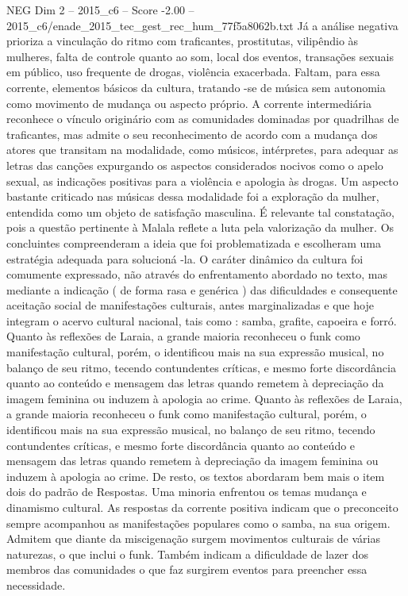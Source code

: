 \begin{textsample}{NEG Dim 2 – 2015\_c6 – Score -2.00 – 2015\_c6/enade\_2015\_tec\_gest\_rec\_hum\_77f5a8062b.txt}
Já a análise negativa prioriza a vinculação do ritmo com traficantes, prostitutas, vilipêndio às mulheres, falta de controle quanto ao som, local dos eventos, transações sexuais em público, uso frequente de drogas, violência exacerbada.
Faltam, para essa corrente, elementos básicos da cultura, tratando -se de música sem autonomia como movimento de mudança ou aspecto próprio.
A corrente intermediária reconhece o vínculo originário com as comunidades dominadas por quadrilhas de traficantes, mas admite o seu reconhecimento de acordo com a mudança dos atores que transitam na modalidade, como músicos, intérpretes, para adequar as letras das canções expurgando os aspectos considerados nocivos como o apelo sexual, as indicações positivas para a violência e apologia às drogas.
Um aspecto bastante criticado nas músicas dessa modalidade foi a exploração da mulher, entendida como um objeto de satisfação masculina.
É relevante tal constatação, pois a questão pertinente à Malala reflete a luta pela valorização da mulher.
Os concluintes compreenderam a ideia que foi problematizada e escolheram uma estratégia adequada para solucioná -la.
O caráter dinâmico da cultura foi comumente expressado, não através do enfrentamento abordado no texto, mas mediante a indicação ( de forma rasa e genérica ) das dificuldades e consequente aceitação social de manifestações culturais, antes marginalizadas e que hoje integram o acervo cultural nacional, tais como : samba, grafite, capoeira e forró.
Quanto às reflexões de Laraia, a grande maioria reconheceu o funk como manifestação cultural, porém, o identificou mais na sua expressão musical, no balanço de seu ritmo, tecendo contundentes críticas, e mesmo forte discordância quanto ao conteúdo e mensagem das letras quando remetem à depreciação da imagem feminina ou induzem à apologia ao crime.
Quanto às reflexões de Laraia, a grande maioria reconheceu o funk como manifestação cultural, porém, o identificou mais na sua expressão musical, no balanço de seu ritmo, tecendo contundentes críticas, e mesmo forte discordância quanto ao conteúdo e mensagem das letras quando remetem à depreciação da imagem feminina ou induzem à apologia ao crime.
De resto, os textos abordaram bem mais o item dois do padrão de Respostas.
Uma minoria enfrentou os temas mudança e dinamismo cultural.
As respostas da corrente positiva indicam que o preconceito sempre acompanhou as manifestações populares como o samba, na sua origem.
Admitem que diante da miscigenação surgem movimentos culturais de várias naturezas, o que inclui o funk.
Também indicam a dificuldade de lazer dos membros das comunidades o que faz surgirem eventos para preencher essa necessidade.

\end{textsample}
